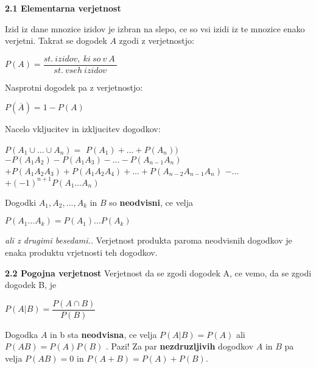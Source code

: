 \documentclass{article}
\begin{document}
\begin{multicols}{3}
\textbf{2.1 Elementarna verjetnost}
\smallskip

Izid iz dane mnozice izidov je izbran na slepo, ce so vsi izidi
iz te mnozice enako verjetni. Takrat se dogodek $A$ zgodi z verjetnostjo:
\begin{center}
    \begin{math}
        P(A) = \dfrac{st.\: izidov,\: ki\: so\: v\: A\:}{st.\: vseh\: izidov}
    \end{math}    
\end{center}
Nasprotni dogodek pa z verjetnostjo:
\begin{center}
    \begin{math}
        P(\overline{A}) = 1 - P(A)
    \end{math}    
\end{center}
Nacelo vkljucitev in izkljucitev dogodkov:
\begin{center}
    \begin{math}
        P(A_{1} \cup \dots \cup A_{n}) =
    \end{math}
    \begin{math}
        P(A_{1}) + \dots + P(A_{n}))
    \end{math}
    \begin{math}
        - P(A_{1} A_{2}) - P(A_{1} A_{3}) - \dots - P(A_{n - 1} A_{n})
    \end{math}
    \begin{math}
        + P(A_{1} A_{2} A_{3}) +P (A_{1} A_{2} A_{4}) + \dots + P(A_{n - 2} A_{n - 1} A_{n})
    \end{math}
    \begin{math}
        - \dots
    \end{math}
    \begin{math}
        + (-1)^{n + 1} P(A_{1} \dots A_{n})
    \end{math}
\end{center}
Dogodki $A_{1}, A_{2}, \dots , A_{k}$ in $B$ so \textbf{neodvisni}, ce velja
\begin{center}
    \begin{math}
        P(A_{1} \dots A_{k}) = P(A_{1}) \dots P(A_{k})
    \end{math}
\end{center}
\textit{ali z drugimi besedami..} Verjetnost produkta paroma neodvisnih
dogodkov je enaka produktu vrjetnosti teh dogodkov.

\textbf{2.2 Pogojna verjetnost}
Verjetnost da se zgodi dogodek A, ce vemo, da se zgodi dogodek B, je
\begin{center}
    \begin{math}
        P(A | B) = \dfrac{P(A \cap B)}{P(B)}
    \end{math}
\end{center}
Dogodka $A$ in b sta \textbf{neodvisna}, ce velja $P(A | B) = P(A)$ ali
$P(A B) = P(A)P(B)$ .
Pazi! Za par \textbf{nezdruzljivih} dogodkov $A$ in $B$
pa velja $P(AB) = 0$ in $P(A + B) = P(A) + P(B)$.


\end{multicols}
\end{document}
